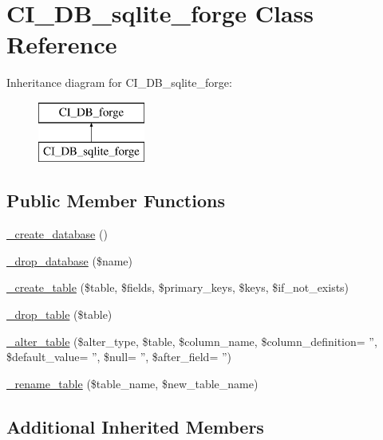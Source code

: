 \hypertarget{class_c_i___d_b__sqlite__forge}{\section{C\-I\-\_\-\-D\-B\-\_\-sqlite\-\_\-forge Class Reference}
\label{class_c_i___d_b__sqlite__forge}
}
Inheritance diagram for C\-I\-\_\-\-D\-B\-\_\-sqlite\-\_\-forge\-:\begin{figure}[H]
\begin{center}
\leavevmode
\includegraphics[height=2.000000cm]{class_c_i___d_b__sqlite__forge}
\end{center}
\end{figure}
\subsection*{Public Member Functions}
\begin{DoxyCompactItemize}
\item 
\hyperlink{class_c_i___d_b__sqlite__forge_a04a053e8e211fd6213a56d990880ce96}{\-\_\-create\-\_\-database} ()
\item 
\hyperlink{class_c_i___d_b__sqlite__forge_a6e04d0af5e8e1e1f93f42d63f0744bfd}{\-\_\-drop\-\_\-database} (\$name)
\item 
\hyperlink{class_c_i___d_b__sqlite__forge_a99d4c17257f468337344690dd590582b}{\-\_\-create\-\_\-table} (\$table, \$fields, \$primary\-\_\-keys, \$keys, \$if\-\_\-not\-\_\-exists)
\item 
\hyperlink{class_c_i___d_b__sqlite__forge_a147efb0d859b7cf4148ff75642515231}{\-\_\-drop\-\_\-table} (\$table)
\item 
\hyperlink{class_c_i___d_b__sqlite__forge_a34fc29f48662e18f6a4f3185a8ea206c}{\-\_\-alter\-\_\-table} (\$alter\-\_\-type, \$table, \$column\-\_\-name, \$column\-\_\-definition= '', \$default\-\_\-value= '', \$null= '', \$after\-\_\-field= '')
\item 
\hyperlink{class_c_i___d_b__sqlite__forge_aec593ba62c6ff875cafeac16b1c54ae6}{\-\_\-rename\-\_\-table} (\$table\-\_\-name, \$new\-\_\-table\-\_\-name)
\end{DoxyCompactItemize}
\subsection*{Additional Inherited Members}


